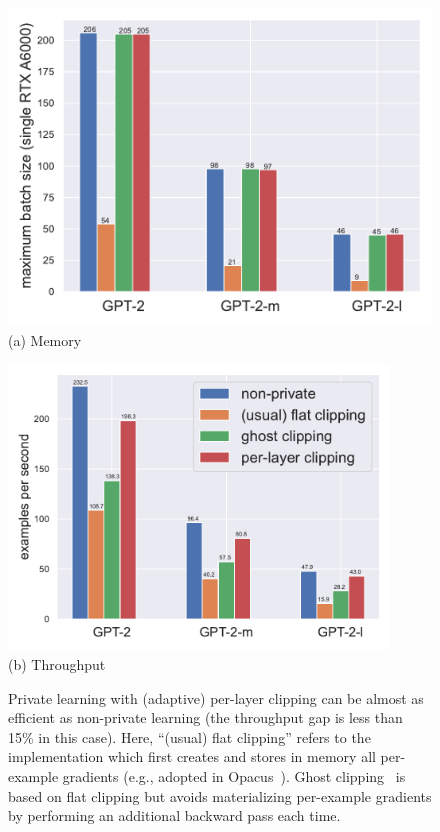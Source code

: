 \begin{figure}[htb]
\begin{center}
\begin{minipage}[t]{0.48\linewidth}
\centering
{\includegraphics[width=0.9\linewidth]{files/fig/memory_100_default_fast_float.pdf}} \\
(a) Memory
\end{minipage}
\begin{minipage}[t]{0.48\linewidth}
\centering
{\includegraphics[width=0.9\textwidth]{files/fig/throughput_100_default_fast_float.pdf}} \\
(b) Throughput
\end{minipage}
\end{center}
\caption{
Private learning with (adaptive) per-layer clipping can be almost as efficient as non-private learning (the throughput gap is less than 15\% in this case).
Here, ``(usual) flat clipping'' refers to the implementation which first creates and stores in memory all per-example gradients (e.g., adopted in Opacus~\citep{yousefpour2021opacus}).
Ghost clipping~\citep{li2022large} is based on flat clipping but avoids materializing per-example gradients by performing an additional backward pass each time. 
}
\label{fig:throughput-comparison}
\end{figure}







